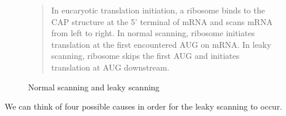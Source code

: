 \begin{figure}
\begin{center}
\end{center}
\caption{Normal scanning and leaky scanning}
\label{dscr4}
\begin{small}
\begin{quotation}
In eucaryotic translation initiation, a ribosome binds to the CAP
structure at the 5' terminal of mRNA and scans mRNA from left to
right.  In normal scanning, ribosome initiates translation at the
first encountered AUG on mRNA. In leaky scanning, ribosome skips the
first AUG and initiates translation at AUG downstream.
\end{quotation}
\end{small}
\end{figure}

We can think of four possible causes in order for the leaky scanning to
occur.

